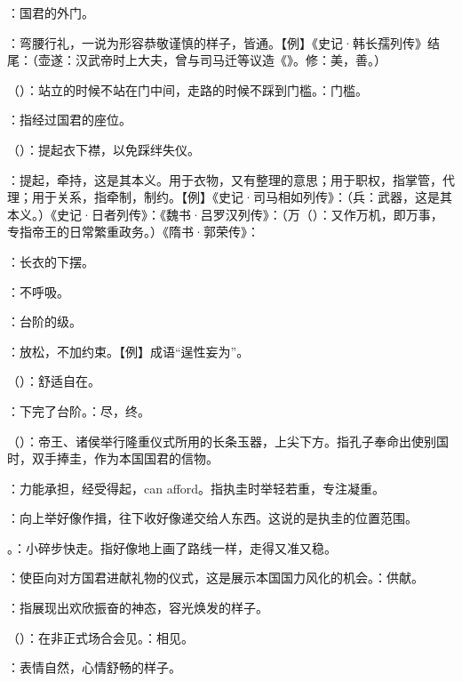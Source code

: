 {
\item {}：国君的外门。
\item {}：弯腰行礼，一说为形容恭敬谨慎的样子，皆通。【例】《史记·韩长孺列传》结尾：（壶遂：汉武帝时上大夫，曾与司马迁等议造《》。修：美，善。）%
\item {}（）：站立的时候不站在门中间，走路的时候不踩到门槛。：门槛。
\item {}：指经过国君的座位。
\item {}（）：提起衣下襟，以免踩绊失仪。

：提起，牵持，这是其本义。用于衣物，又有整理的意思；用于职权，指掌管，代理；用于关系，指牵制，制约。【例】《史记·司马相如列传》：（兵：武器，这是其本义。）《史记·日者列传》：《魏书·吕罗汉列传》：（万（）：又作万机，即万事，专指帝王的日常繁重政务。）《隋书·郭荣传》：

：长衣的下摆。
\item {}：不呼吸。
\item {}：台阶的级。
\item {}：放松，不加约束。【例】成语“逞性妄为”。
\item {}（）：舒适自在。
\item {}：下完了台阶。：尽，终。
}
{}


{
\item {}（）：帝王、诸侯举行隆重仪式所用的长条玉器，上尖下方。指孔子奉命出使别国时，双手捧圭，作为本国国君的信物。
\item {}：力能承担，经受得起，can afford。指执圭时举轻若重，专注凝重。
\item {}：向上举好像作揖，往下收好像递交给人东西。这说的是执圭的位置范围。
\item {}。：小碎步快走。指好像地上画了路线一样，走得又准又稳。
\item {}：使臣向对方国君进献礼物的仪式，这是展示本国国力风化的机会。：供献。
\item {}：指展现出欢欣振奋的神态，容光焕发的样子。
\item {}（）：在非正式场合会见。：相见。
\item {}：表情自然，心情舒畅的样子。
}
{}


